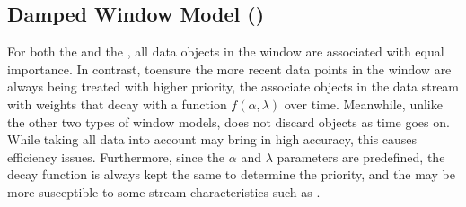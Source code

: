 \subsection{Damped Window Model (\damped)}
\label{subsec:damped}
For both the \landmark and the \sliding, all data objects in the window are associated with equal importance. In contrast, toensure the more recent data points in the window are always being treated with higher priority, the \damped associate objects in the data stream with weights that decay with a function $f(\alpha, \lambda)$ over time. Meanwhile, unlike the other two types of window models, \damped does not discard objects as time goes on. While taking all data into account may bring in high accuracy, this causes efficiency issues. Furthermore, since the $\alpha$ and $\lambda$ parameters are predefined, the decay function is always kept the same to determine the priority, and the \damped may be more susceptible to some stream characteristics such as \oef.


